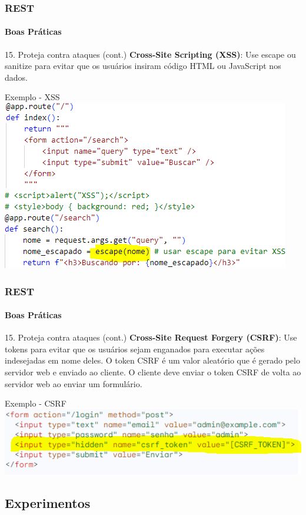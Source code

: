 \documentclass[
	9pt, %
	t, %
]{beamer}
\newcommand{\yellowbox}[1]{\colorbox{yellow!75}{#1}}
\begin{document}
\begin{frame}
	\frametitle{REST}
	\framesubtitle{Boas Práticas}

	\begin{block}{15. Proteja contra ataques (cont.)}
		\textbf{Cross-Site Scripting (XSS)}: Use \yellowbox{escape} ou \yellowbox{sanitize} para evitar que os usuários insiram código HTML ou JavaScript nos dados.
	\end{block}

	\begin{exampleblock}{Exemplo - XSS}
		\includegraphics[width=0.6\linewidth]{xss_example.png}
	\end{exampleblock}

\end{frame}

\begin{frame}
	\frametitle{REST}
	\framesubtitle{Boas Práticas}

	\begin{block}{15. Proteja contra ataques (cont.)}
		\textbf{Cross-Site Request Forgery (CSRF)}: Use \yellowbox{tokens} para evitar que os usuários sejam enganados para executar ações indesejadas em nome deles. O token CSRF é um valor aleatório que é gerado pelo servidor web e enviado ao cliente. O cliente deve enviar o token CSRF de volta ao servidor web ao enviar um formulário.
	\end{block}

	\begin{exampleblock}{Exemplo - CSRF}
		\includegraphics[width=0.9\linewidth]{csrf_example.png}
	\end{exampleblock}

\end{frame}

\subsection{Experimentos}
\end{document}
